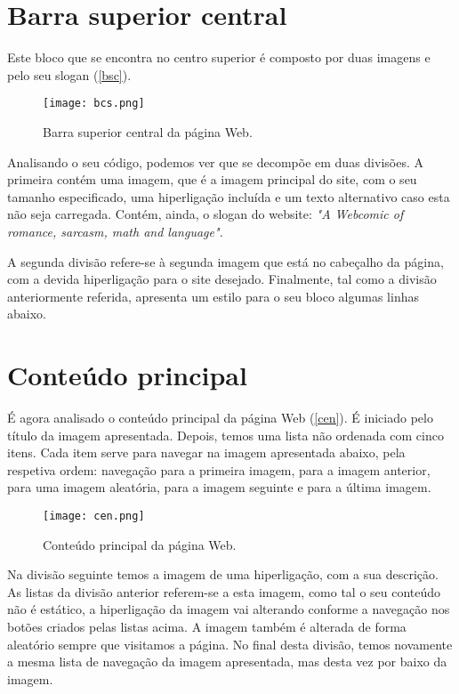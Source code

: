 \documentclass[11pt,openright,twoside]{report}
\begin{document}
\section{Barra superior central}
Este bloco que se encontra no centro superior é composto por duas imagens e pelo seu slogan (\autoref{bsc}).
\smallskip 

\begin{figure}
 \center
 \texttt{[image: bcs.png]}
 \caption{Barra superior central da página Web.}
 \label{bsc}
\end{figure}


Analisando o seu código, podemos ver que se decompõe em duas divisões. A primeira contém uma imagem, que é a imagem principal do site, com o seu tamanho especificado, uma hiperligação incluída e um texto alternativo caso esta não seja carregada. Contém, ainda, o slogan do website: \textit{"A Webcomic of romance, sarcasm, math and language".}
\smallskip 

A segunda divisão refere-se à segunda imagem que está no cabeçalho da página, com a devida hiperligação para o site desejado. Finalmente, tal como a divisão anteriormente referida, apresenta um estilo para o seu bloco algumas linhas abaixo.


\section{Conteúdo principal}
É agora analisado o conteúdo principal da página Web (\autoref{cen}). É iniciado pelo título da imagem apresentada. Depois, temos uma lista não ordenada com cinco itens. Cada item serve para navegar na imagem apresentada abaixo, pela respetiva ordem: navegação para a primeira imagem, para a imagem anterior, para uma imagem aleatória, para a imagem seguinte e para a última imagem.
\smallskip

\begin{figure}
 \center
 \texttt{[image: cen.png]}
 \caption{Conteúdo principal da página Web.}
 \label{cen}
\end{figure}


Na divisão seguinte temos a imagem de uma hiperligação, com a sua descrição. As listas da divisão anterior referem-se a esta imagem, como tal o seu conteúdo não é estático, a hiperligação da imagem vai alterando conforme a navegação nos botões criados pelas listas acima. A imagem também é alterada de forma aleatório sempre que visitamos a página. No final desta divisão, temos novamente a mesma lista de navegação da imagem apresentada, mas desta vez por baixo da imagem.
\smallskip
\end{document}
